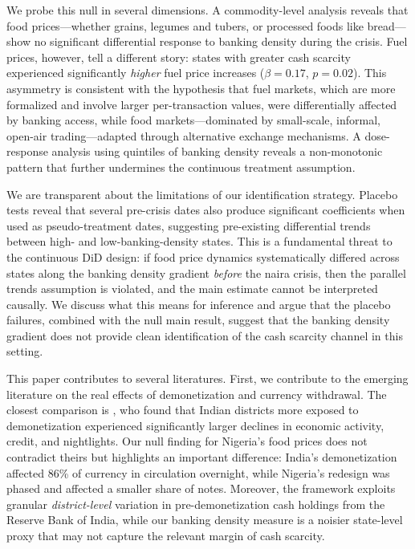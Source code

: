 \documentclass[12pt]{article}
\begin{document}
We probe this null in several dimensions. A commodity-level analysis reveals that food prices---whether grains, legumes and tubers, or processed foods like bread---show no significant differential response to banking density during the crisis. Fuel prices, however, tell a different story: states with greater cash scarcity experienced significantly \textit{higher} fuel price increases ($\beta = 0.17$, $p = 0.02$). This asymmetry is consistent with the hypothesis that fuel markets, which are more formalized and involve larger per-transaction values, were differentially affected by banking access, while food markets---dominated by small-scale, informal, open-air trading---adapted through alternative exchange mechanisms. A dose-response analysis using quintiles of banking density reveals a non-monotonic pattern that further undermines the continuous treatment assumption.

We are transparent about the limitations of our identification strategy. Placebo tests reveal that several pre-crisis dates also produce significant coefficients when used as pseudo-treatment dates, suggesting pre-existing differential trends between high- and low-banking-density states. This is a fundamental threat to the continuous DiD design: if food price dynamics systematically differed across states along the banking density gradient \textit{before} the naira crisis, then the parallel trends assumption is violated, and the main estimate cannot be interpreted causally. We discuss what this means for inference and argue that the placebo failures, combined with the null main result, suggest that the banking density gradient does not provide clean identification of the cash scarcity channel in this setting.

This paper contributes to several literatures. First, we contribute to the emerging literature on the real effects of demonetization and currency withdrawal. The closest comparison is \citet{chodorow2020cash}, who found that Indian districts more exposed to demonetization experienced significantly larger declines in economic activity, credit, and nightlights. Our null finding for Nigeria's food prices does not contradict theirs but highlights an important difference: India's demonetization affected 86\% of currency in circulation overnight, while Nigeria's redesign was phased and affected a smaller share of notes. Moreover, the \citet{chodorow2020cash} framework exploits granular \textit{district-level} variation in pre-demonetization cash holdings from the Reserve Bank of India, while our banking density measure is a noisier state-level proxy that may not capture the relevant margin of cash scarcity.
\end{document}
